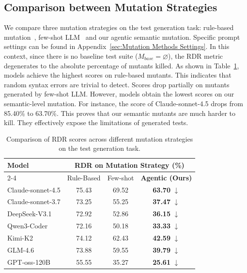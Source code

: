 \documentclass[11pt]{article}
\begin{document}
\subsection{Comparison between Mutation Strategies}
We compare three mutation strategies on the test generation task: rule-based mutation~\citep{jain2025testgeneval}, few-shot LLM~\citep{tip2025llmorpheus} and our agentic semantic mutation. Specific prompt settings can be found in Appendix~\ref{sec:Mutation Methods Settings}. In this context, since there is no baseline test suite ($M_{base} = \varnothing$), the RDR metric degenerates to the absolute percentage of mutants killed. As shown in Table~\ref{tab:mutation_comparison}, models achieve the highest scores on rule-based mutants. This indicates that random syntax errors are trivial to detect. Scores drop partially on mutants generated by few-shot LLM. However, models obtain the lowest scores on our semantic-level mutation. For instance, the score of Claude-sonnet-4.5 drops from 85.40\% to 63.70\%. This proves that our semantic mutants are much harder to kill. They effectively expose the limitations of generated tests. 
\begin{table}[ht]
  \centering
  \small
  \renewcommand{\arraystretch}{1.2}
  \setlength{\tabcolsep}{3.5pt}
  \caption{\label{tab:mutation_comparison}
    Comparison of RDR scores across different mutation strategies on the test generation task.
  }
  \begin{tabular}{l ccc}
    \toprule
    \multirow{2}{*}{Model} & \multicolumn{3}{c}{RDR on Mutation Strategy (\%)} \\
    \cmidrule(lr){2-4}
    & Rule-Based & Few-shot & \textbf{Agentic (Ours)} \\
    \midrule
    Claude-sonnet-4.5 & 75.43 & 69.52 & \textbf{63.70} $\downarrow$ \\
    Claude-sonnet-3.7 & 73.25 & 55.25 & \textbf{37.47} $\downarrow$ \\
    DeepSeek-V3.1     & 72.92 & 52.86 & \textbf{36.15} $\downarrow$ \\
    Qwen3-Coder       & 72.16 & 50.18 & \textbf{33.33} $\downarrow$ \\
    Kimi-K2           & 74.12 & 62.43 & \textbf{42.59} $\downarrow$ \\
    GLM-4.6           & 73.88 & 59.55 & \textbf{39.79} $\downarrow$ \\
    GPT-oss-120B      & 55.55 & 35.27 & \textbf{25.61} $\downarrow$ \\
    \bottomrule
  \end{tabular}
\end{table}
\end{document}

